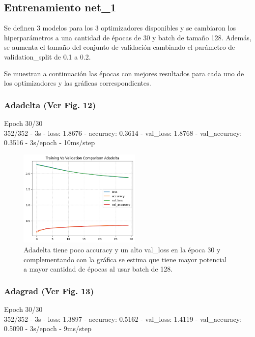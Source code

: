 \documentclass[journal]{IEEEtai}
\begin{document}
\subsection{Entrenamiento net\_1}

Se definen 3 modelos para los 3 optimizadores disponibles y se cambiaron los hiperparámetros a una cantidad de épocas de 30 y batch de tamaño 128. Además, se aumenta el tamaño del conjunto de validación cambiando el parámetro de validation\_split de 0.1 a 0.2.

Se muestran a continuación las épocas con mejores resultados para cada uno de los optimizadores y las gráficas correspondientes.

\subsubsection{\textbf{Adadelta} (Ver Fig. 12)} 
\hfill\break
Epoch 30/30\\
352/352 - 3s - loss: 1.8676 - accuracy: 0.3614 - val\_loss: 1.8768 - val\_accuracy: 0.3516 - 3s/epoch - 10ms/step

\begin{figure}[h!]
\centering
\includegraphics[width=6cm]{img/net1adadelta.png}
\caption{Adadelta tiene poco accuracy y un alto val\_loss en la época 30 y complementando con la gráfica se estima que tiene mayor potencial a mayor cantidad de épocas al usar batch de 128.}
\label{fig: net1adadelta}
\end{figure}

\subsubsection{\textbf{Adagrad} (Ver Fig. 13)} 
\hfill\break
Epoch 30/30\\
352/352 - 3s - loss: 1.3897 - accuracy: 0.5162 - val\_loss: 1.4119 - val\_accuracy: 0.5090 - 3s/epoch - 9ms/step
\end{document}
